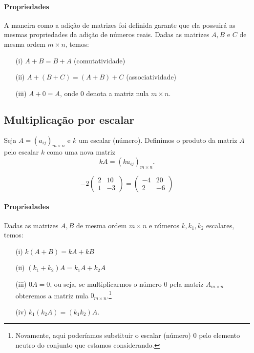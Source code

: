 \paragraph*{Propriedades} A maneira como a adição de matrizes foi definida garante que ela possuirá as mesmas propriedades da adição de números reais. Dadas as matrizes $A,B$ e $C$ de mesma ordem $m\times n$, temos:
\begin{itemize}
    \item[(i)] $A+B=B+A$ (comutatividade)
    \item[(ii)] $A+(B+C)=(A+B)+C$ (associatividade)
    \item[(iii)] $A+0 = A$, onde $0$ denota a matriz nula $m\times n$.
\end{itemize}

\subsection{Multiplicação por escalar}

Seja $A=(a_{ij})_{m\times n}$ e $k$ um escalar (número). Definimos o produto da matriz $A$ pelo escalar $k$ como uma nova matriz 
\begin{equation*}
    kA = (ka_{ij})_{m\times n}.
\end{equation*}

\begin{exemplo}
    \begin{equation*}
        -2 \begin{pmatrix}
            2 & 10\\
            1 & -3
           \end{pmatrix}
        =
           \begin{pmatrix}
            -4 & 20\\
            2 & -6
           \end{pmatrix}
    \end{equation*}
\end{exemplo}

\paragraph*{Propriedades} Dadas as matrizes $A,B$ de mesma ordem $m\times n$ e números $k,k_1,k_2$ escalares, temos:
\begin{itemize}
    \item[(i)] $k(A+B) = kA+kB$
    \item[(ii)] $(k_1+k_2)A = k_1A+k_2A$
    \item[(iii)] $0A = 0$, ou seja, se multiplicarmos o número $0$ pela matriz $A_{m\times n}$ obteremos a matriz nula $0_{m\times n}$.\footnote{Novamente, aqui poderíamos substituir o escalar (número) $0$ pelo elemento neutro do conjunto que estamos considerando.}
    \item[(iv)] $k_1(k_2A) = (k_1k_2)A$.
\end{itemize}

